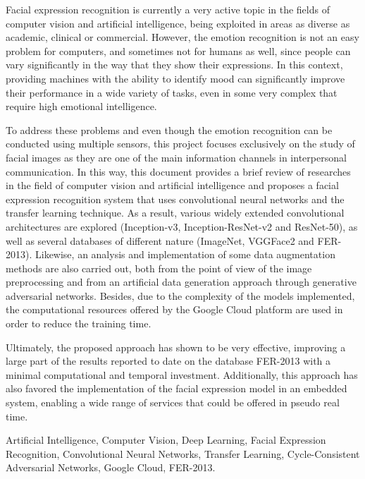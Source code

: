 \thispagestyle{plain}

\begin{summary}
Facial expression recognition is currently a very active topic in the fields of computer vision and artificial intelligence, being exploited in areas as diverse as academic, clinical or commercial.  However, the emotion recognition is not an easy problem for computers, and sometimes not for humans as well, since people can vary significantly in the way that they show their expressions. In this context, providing machines with the ability to identify mood can significantly improve their performance in a wide variety of tasks, even in some very complex that require high emotional intelligence.

To address these problems and even though the emotion recognition can be conducted using multiple sensors, this project focuses exclusively on the study of facial images as they are one of the main information channels in interpersonal communication. In this way, this document provides a brief review of researches in the field of computer vision and artificial intelligence and proposes a facial expression recognition system that uses convolutional neural networks and the transfer learning technique. As a result, various widely extended convolutional architectures are explored (Inception-v3, Inception-ResNet-v2 and ResNet-50), as well as several databases of different nature (ImageNet, VGGFace2 and FER-2013). Likewise, an analysis and implementation of some data augmentation methods are also carried out, both from the point of view of the image preprocessing and from an artificial data generation approach through generative adversarial networks. Besides, due to the complexity of the models implemented, the computational resources offered by the Google Cloud platform are used in order to reduce the training time.

Ultimately, the proposed approach has shown to be very effective, improving a large part of the results reported to date on the database FER-2013 with a minimal computational and temporal investment. Additionally, this approach has also favored the implementation of the facial expression model in an embedded system, enabling a wide range of services that could be offered in pseudo real time.
\end{summary}

\begin{keywords}
Artificial Intelligence, Computer Vision, Deep Learning, Facial Expression Recognition, Convolutional Neural Networks, Transfer Learning, Cycle-Consistent Adversarial Networks, Google Cloud, FER-2013.
\end{keywords}
